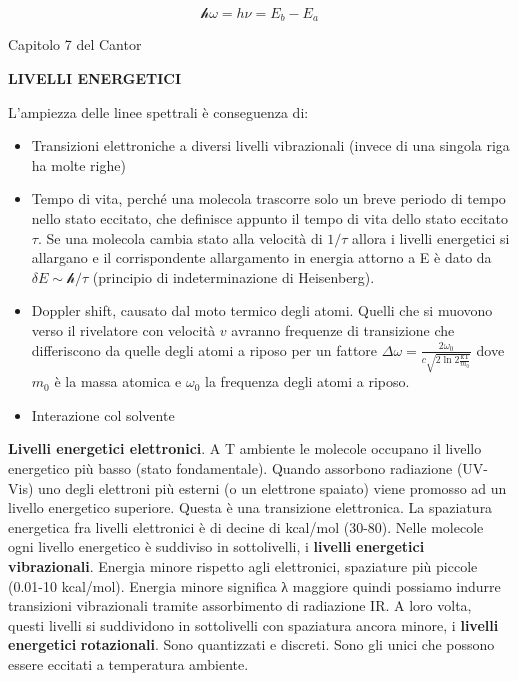 \[\mathcal{h}\omega = h\nu = E_{b} - E_{a}\]

Capitolo 7 del Cantor

\textbf{LIVELLI ENERGETICI}

L'ampiezza delle linee spettrali è conseguenza di:

\begin{itemize}
\item
  Transizioni elettroniche a diversi livelli vibrazionali (invece di una
  singola riga ha molte righe)
\item
  Tempo di vita, perché una molecola trascorre solo un breve periodo di
  tempo nello stato eccitato, che definisce appunto il tempo di vita
  dello stato eccitato \(\tau\). Se una molecola cambia stato alla
  velocità di \(1/\tau\) allora i livelli energetici si allargano e il
  corrispondente allargamento in energia attorno a E è dato da
  \(\delta E \sim \mathcal{h/}\tau\) (principio di indeterminazione di
  Heisenberg).
\item
  Doppler shift, causato dal moto termico degli atomi. Quelli che si
  muovono verso il rivelatore con velocità \(v\) avranno frequenze di
  transizione che differiscono da quelle degli atomi a riposo per un
  fattore
  \(\Delta\omega = \frac{2\omega_{0}}{c\sqrt{2\ln 2\frac{\text{kT}}{m_{0}}}}\)
  dove \(m_{0}\) è la massa atomica e \(\omega_{0}\) la frequenza degli
  atomi a riposo.
\item
  Interazione col solvente
\end{itemize}

\textbf{Livelli energetici elettronici}. A T ambiente le molecole
occupano il livello energetico più basso (stato fondamentale). Quando
assorbono radiazione (UV-Vis) uno degli elettroni più esterni (o un
elettrone spaiato) viene promosso ad un livello energetico superiore.
Questa è una transizione elettronica. La spaziatura energetica fra
livelli elettronici è di decine di kcal/mol (30-80). Nelle molecole ogni
livello energetico è suddiviso in sottolivelli, i \textbf{livelli}
\textbf{energetici} \textbf{vibrazionali}. Energia minore rispetto agli
elettronici, spaziature più piccole (0.01-10 kcal/mol). Energia minore
significa λ maggiore quindi possiamo indurre transizioni vibrazionali
tramite assorbimento di radiazione IR. A loro volta, questi livelli si
suddividono in sottolivelli con spaziatura ancora minore, i
\textbf{livelli} \textbf{energetici} \textbf{rotazionali}. Sono
quantizzati e discreti. Sono gli unici che possono essere eccitati a
temperatura ambiente.

